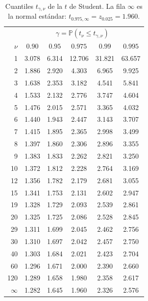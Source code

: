 \documentclass[11pt]{article}
\theoremstyle{plain}
\theoremstyle{definition}
\theoremstyle{remark}
\theoremstyle{solstyle}
\newcommand{\Pbb}{\mathbb{P}}
\newcommand{\1}{\mathbbm{1}}
\begin{document}
\begin{table}[H]
\centering\small
\renewcommand{\arraystretch}{1.08}
\begin{tabular}{r|ccccc}
\toprule
& \multicolumn{5}{c}{$\gamma=\Pbb(t_\nu\le t_{\gamma,\nu})$}\\
$\nu$ & $0.90$ & $0.95$ & $0.975$ & $0.99$ & $0.995$ \\
\midrule
1 & 3.078 & 6.314 & 12.706 & 31.821 & 63.657 \\
2 & 1.886 & 2.920 & 4.303 & 6.965 & 9.925 \\
3 & 1.638 & 2.353 & 3.182 & 4.541 & 5.841 \\
4 & 1.533 & 2.132 & 2.776 & 3.747 & 4.604 \\
5 & 1.476 & 2.015 & 2.571 & 3.365 & 4.032 \\
6 & 1.440 & 1.943 & 2.447 & 3.143 & 3.707 \\
7 & 1.415 & 1.895 & 2.365 & 2.998 & 3.499 \\
8 & 1.397 & 1.860 & 2.306 & 2.896 & 3.355 \\
9 & 1.383 & 1.833 & 2.262 & 2.821 & 3.250 \\
10 & 1.372 & 1.812 & 2.228 & 2.764 & 3.169 \\
12 & 1.356 & 1.782 & 2.179 & 2.681 & 3.055 \\
15 & 1.341 & 1.753 & 2.131 & 2.602 & 2.947 \\
19 & 1.328 & 1.729 & 2.093 & 2.539 & 2.861 \\
20 & 1.325 & 1.725 & 2.086 & 2.528 & 2.845 \\
29 & 1.311 & 1.699 & 2.045 & 2.462 & 2.756 \\
30 & 1.310 & 1.697 & 2.042 & 2.457 & 2.750 \\
40 & 1.303 & 1.684 & 2.021 & 2.423 & 2.704 \\
60 & 1.296 & 1.671 & 2.000 & 2.390 & 2.660 \\
120 & 1.289 & 1.658 & 1.980 & 2.358 & 2.617 \\
\midrule
$\infty$ & 1.282 & 1.645 & 1.960 & 2.326 & 2.576 \\
\bottomrule
\end{tabular}
\caption{Cuantiles $t_{\gamma,\nu}$ de la $t$ de Student. La fila $\infty$ es la normal estándar: $t_{0.975,\infty}=z_{0.025}=1.960$.}
\label{tab:t}
\end{table}
\end{document}
